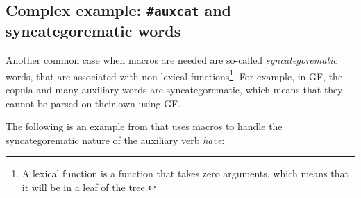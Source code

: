 \subsection{Complex example: \texttt{\#auxcat} and syncategorematic words}

Another common case when macros are needed are so-called \emph{syncategorematic} words, that are associated with non-lexical functions\footnote{A lexical function is a function that takes zero arguments, which means that it will be in a leaf of the tree.}. For example, in GF, the copula and many auxiliary words are syncategorematic, which means that they cannot be parsed on their own using GF.

The following is an example from \cite{kolachina-ranta-2017} that uses macros to handle the syncategorematic nature of the auxiliary verb \emph{have}:







